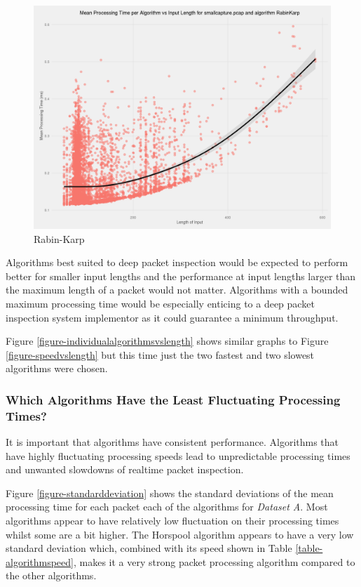 \documentclass[9pt, technote]{IEEEtran}
\begin{document}
\begin{figure}[!hbt]
  \centering
  \includegraphics[width=\columnwidth]{images/scatter_mean_vs_input_length_RabinKarp}
  \caption{Rabin-Karp}
\end{figure}

Algorithms best suited to deep packet inspection would be expected to perform better for smaller input lengths and the performance at input lengths larger than the maximum length of a packet would not matter. Algorithms with a bounded maximum processing time would be especially enticing to a deep packet inspection system implementor as it could guarantee a minimum throughput. 

Figure \ref{figure-individualalgorithmsvslength} shows similar graphs to Figure \ref{figure-speedvslength} but this time just the two fastest and two slowest algorithms were chosen.

\subsubsection{Which Algorithms Have the Least Fluctuating Processing Times?}

It is important that algorithms have consistent performance. Algorithms that have highly fluctuating processing speeds lead to unpredictable processing times and unwanted slowdowns of realtime packet inspection.

Figure \ref{figure-standarddeviation} shows the standard deviations of the mean processing time for each packet each of the algorithms for \textit{Dataset A}. Most algorithms appear to have relatively low fluctuation on their processing times whilst some are a bit higher. The Horspool \citep{horspool1980} algorithm appears to have a very low standard deviation which, combined with its speed shown in Table \ref{table-algorithmspeed}, makes it a very strong packet processing algorithm compared to the other algorithms.
\end{document}
